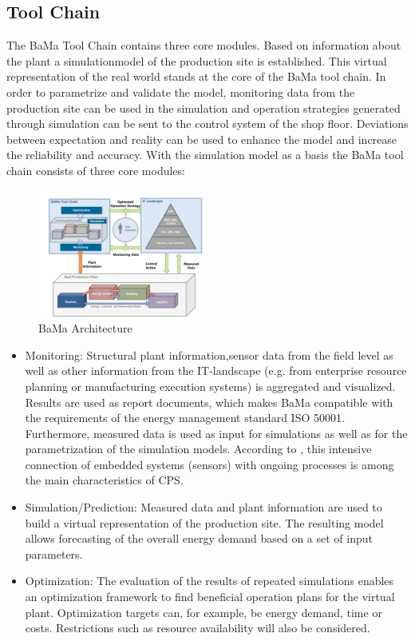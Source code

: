 \documentclass[3p,times,procedia,twocolumn,twoside]{elsarticle}
\begin{document}
\subsection{Tool Chain}
\label{CHAP_ToolChain}
The BaMa Tool Chain contains three core modules. Based on information about the plant a simulation\linebreak model of the production site is established. This virtual representation of the real world stands at the core of the BaMa tool chain. In order to parametrize and validate the model, monitoring data from the production site can be used in the simulation and operation strategies generated through simulation can be sent to the control system of the shop floor. Deviations between expectation and reality can be used to enhance the model and increase the reliability and accuracy.  With the simulation model as a basis the BaMa tool chain consists of three core modules: 
\begin{figure}
	\includegraphics[width=0.5\textwidth]{figures/Architecture_new}
	\caption{BaMa Architecture}
	\label{FIG_Architecture}
\end{figure}
\begin{itemize}
	\item{Monitoring: Structural plant information,\linebreak sensor data from the field level as well as other information from the IT-landscape (e.g. from enterprise resource planning or manufacturing execution systems)  is aggregated and visualized. Results are used as report documents, which makes BaMa compatible with the requirements of the energy management standard ISO 50001. Furthermore, measured data is used as input for simulations as well as for the parametrization of the simulation models. According to \cite{monostori_cyber-physical_2014}, this intensive connection of embedded systems (sensors) with ongoing processes is among the main characteristics of CPS.}
	\item{Simulation/Prediction: Measured data and plant information are used to build a virtual representation of the production site. The resulting model allows forecasting of the overall energy demand based on a set of input parameters.}
	\item{Optimization: The evaluation of the results of repeated simulations enables an optimization framework to find beneficial operation plans for the virtual plant. Optimization targets can, for example, be energy demand, time or costs. Restrictions such as resource availability will also be considered.}
\end{itemize}
\end{document}

